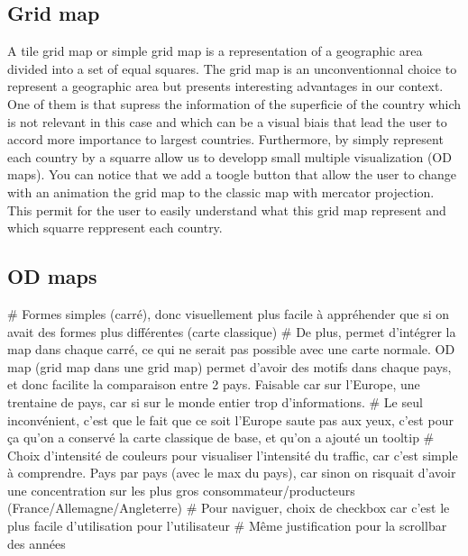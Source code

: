 \documentclass{vgtc}
\begin{document}
\subsection{Grid map}
A tile grid map or simple grid map is a representation of a geographic area divided into a set of equal squares\cite{Good Data Visualization Practice: Tile Grid Maps}.
The grid map is an unconventionnal choice to represent a geographic area but presents interesting advantages in our context. One of them is that supress the information of the superficie of the country which is not relevant in this case and which can be a visual biais that lead the user to accord more importance to largest countries. Furthermore, by simply represent each country by a squarre allow us to developp small multiple visualization (OD maps). You can notice that we add a toogle button that allow the user to change with an animation the grid map to the classic map with mercator projection. This permit for the user to easily understand what this grid map represent and which squarre reppresent each country. 


\subsection{OD maps}
# Formes simples (carré), donc visuellement plus facile à appréhender que si on avait des formes plus différentes (carte classique)
# De plus, permet d'intégrer la map dans chaque carré, ce qui ne serait pas possible avec une carte normale. OD map (grid map dans une grid map) permet d'avoir des motifs dans chaque pays, et donc facilite la comparaison entre 2 pays. Faisable car sur l'Europe, une trentaine de pays, car si sur le monde entier trop d'informations. 
# Le seul inconvénient, c'est que le fait que ce soit l'Europe saute pas aux yeux, c'est pour ça qu'on a conservé la carte classique de base, et qu'on a ajouté un tooltip  
# Choix d'intensité de couleurs pour visualiser l'intensité du traffic, car c'est simple à comprendre. Pays par pays (avec le max du pays), car sinon on risquait d'avoir une concentration sur les plus gros consommateur/producteurs (France/Allemagne/Angleterre)
# Pour naviguer, choix de checkbox car c'est le plus facile d'utilisation pour l'utilisateur
# Même justification pour la scrollbar des années 
\end{document}
